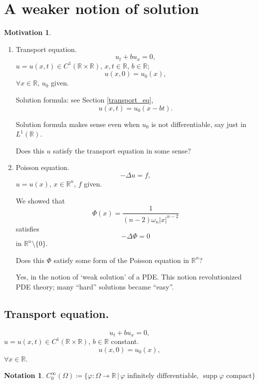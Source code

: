 \documentclass[12pt]{article}
\DeclareMathOperator{\supp}{supp}
\theoremstyle{definition}
\newtheorem*{notation}{Notation}
\newtheorem*{motivation}{Motivation}
\begin{document}
\section{A weaker notion of solution}
\begin{motivation}
\begin{enumerate}[label=(\arabic*)]
\item Transport equation.
\[u_t+bu_x=0,\]
$u=u(x,t)\in C^1(\mathbb{R}\times\mathbb{R})$, $x,t\in\mathbb{R}$, $b\in\mathbb{R}$;
\[u(x,0)=u_0(x),\]
$\forall x\in\mathbb{R}$, $u_0$ given.

Solution formula: see Section \ref{transport_eq},
\[u(x,t)=u_0(x-bt).\]

Solution formula makes sense even when $u_0$ is not differentiable, say just in $L^1(\mathbb{R})$.

Does this $u$ satisfy the transport equation in some sense?

\item Poisson equation.
\[-\Delta u=f,\]
$u=u(x)$, $x\in\mathbb{R}^n$, $f$ given.

We showed that
\[\Phi(x)=\frac{1}{(n-2)\omega_n|x|^{n-2}}\]
satisfies
\[-\Delta\Phi=0\]
in $\mathbb{R}^n\setminus\{0\}$.

Does this $\Phi$ satisfy some form of the Poisson equation in $\mathbb{R}^n$?

Yes, in the notion of `weak solution' of a PDE. This notion revolutionized PDE theory; many ``hard'' solutions became ``easy''.
\end{enumerate}
\end{motivation}

\subsection*{Transport equation.}
\begin{equation}\tag{T}\label{transport_strong}
u_t+bu_x=0,
\end{equation}
$u=u(x,t)\in C^1(\mathbb{R}\times\mathbb{R})$, $b\in\mathbb{R}$ constant.
\begin{equation}\tag{IC}
u(x,0)=u_0(x),
\end{equation}
$\forall x\in\mathbb{R}$.

\begin{notation}
$C_0^{\infty}(\Omega)\coloneqq\{\varphi:\Omega\rightarrow\mathbb{R}\,|\,\varphi\text{ infinitely differentiable},\,\supp\varphi\text{ compact}\}$
\end{notation}
\end{document}

